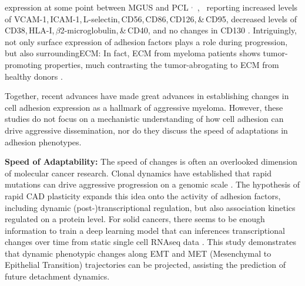 expression at some point between \ac{MGUS} and \ac{PCL}%
%
$^,$\,%
,~%
reporting %
increased levels of VCAM-1,\,ICAM-1,\,L-selectin,\,CD56,\,CD86,\,CD126,\,\&\,CD95, %
decreased levels of CD38,\,HLA-I,\,$\beta$2-microglobulin,\,\&\,CD40, and %
no changes in CD130 %
\cite{terposIncreasedCirculatingVCAM12016, perez-andresClonalPlasmaCells2005}.
Intriguingly, not only surface expression of adhesion factors plays a role
during progression, but also surrounding\ac{ECM}: In fact, \ac{ECM} from myeloma
patients shows tumor-promoting properties, much contrasting the tumor-abrogating
to \ac{ECM} from healthy donors \cite{ibraheemBMMSCsderivedECMModifies2019}.

Together, recent advances have made great advances in establishing changes in
cell adhesion expression as a hallmark of aggressive myeloma. However, these
studies do not focus on a mechanistic understanding of how cell adhesion can
drive aggressive dissemination, nor do they discuss the speed of adaptations in
adhesion phenotypes.

\textbf{Speed of Adaptability:}
The speed of changes is often an overlooked dimension of molecular cancer
research. Clonal dynamics have established that rapid mutations can drive
aggressive progression on a genomic scale
\citet{keatsClonalCompetitionAlternating2012,
      eversPrognosticValueExtracellular2023}. The hypothesis of rapid \ac{CAD}
plasticity expands this idea onto the activity of adhesion factors, including
dynamic (post-)transcriptional regulation, but also association kinetics
regulated on a protein level. For solid cancers, there seems to be enough
information to train a deep learning model that can inferences transcriptional
changes over time from static single cell RNAseq data
\cite{tongLearningTranscriptionalRegulatory2023}. This study demonstrates that
dynamic phenotypic changes along \ac{EMT} and MET (Mesenchymal to Epithelial
Transition) trajectories can be projected, assisting the prediction of future
detachment dynamics.

